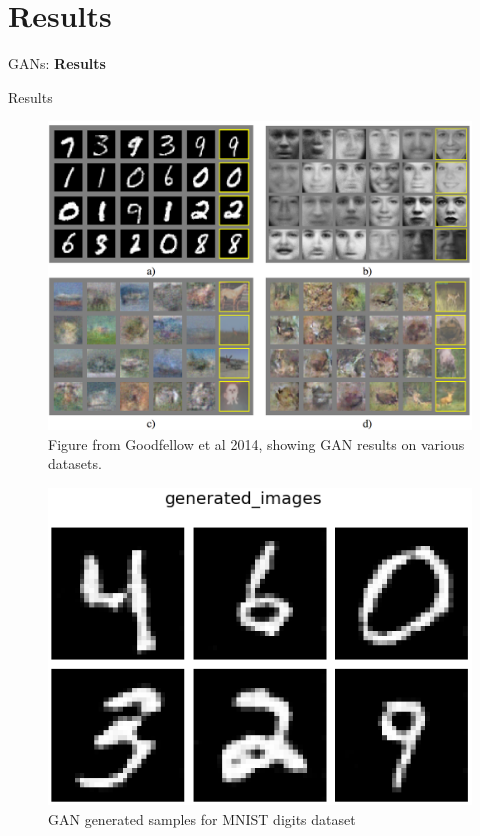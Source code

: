 \section{Results}
\begin{frame}{}
    \LARGE GANs: \textbf{Results}
\end{frame}

\begin{frame}[allowframebreaks]{Results}
\begin{figure}
    \centering
    \includegraphics[height=0.8\textheight, width=\textwidth, keepaspectratio]{images/gan/result-goodfellow.png}
    \caption*{Figure from Goodfellow et al 2014, showing GAN results on various datasets.}
\end{figure}

\framebreak
\begin{figure}
    \centering
    \includegraphics[height=0.8\textheight, width=\textwidth, keepaspectratio]{images/gan/gan_results_mnist.png}
    \caption*{GAN generated samples for MNIST digits dataset}
\end{figure}


\end{frame}
